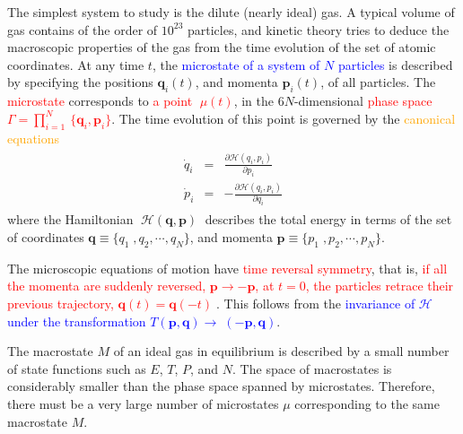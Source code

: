 \documentclass[12pt,a4paper]{article}
\renewcommand{\vec}[1]{\boldsymbol{#1}}
\newcounter{theo}[section]\setcounter{theo}{0}
\begin{document}
\cite{2007spp..book.....K} The simplest system to study is the dilute (nearly ideal) gas. A typical volume of gas contains of the order of $10^{23}$ particles, and kinetic theory tries to deduce the macroscopic properties of the gas from the time evolution of the set of atomic coordinates. At any time $t$, the \textcolor{blue}{microstate of a system of $N$ particles} is described by specifying the positions $\vec{q}_i(t)$, and momenta $\vec{p}_i(t)$, of all particles. The \textcolor{red}{microstate} corresponds to \textcolor{red}{a point 􏱕$\mu(t)$}, in the $6N$-dimensional \textcolor{red}{phase space $\Gamma = \prod_{i=1􏱌}^N \{\vec{q}_i, \vec{p}_i\}$}. The time evolution of this point is governed by the \textcolor{orange}{canonical equations}
\begin{eqnarray}
\begin{split}
\dot{q}_i &=& \frac{\partial \mathcal H(q_i, p_i)}{\partial p_i}  \\
\dot{p}_i &=& -\frac{\partial \mathcal H(q_i, p_i)}{\partial q_i} 
\end{split}
\end{eqnarray}
where the Hamiltonian 􏲾$\mathcal H(\vec{q}, \vec{p})$􏱑 describes the total energy in terms of the set of coordinates $\vec{q} \equiv \{ q_1􏱍, q_2, \cdots, q_N\}$, and momenta $\vec{p} \equiv \{ p_1􏱍, p_2, \cdots, p_N\}$.

The microscopic equations of motion have \textcolor{red}{time reversal symmetry}, that is, \textcolor{red}{if all the momenta are suddenly reversed, $\vec{p} \rightarrow -\vec{p}$, at $t = 0$, the particles retrace their previous trajectory, $\vec{q}(t) = \vec{q}(-t)$􏱑}. This follows from the \textcolor{blue}{invariance of $\mathcal H$ under the transformation $T(\vec{p}, \vec{q}) → 􏱐(-\vec{p}, \vec{q})$}.

The macrostate $M$ of an ideal gas in equilibrium is described by a small number of state functions such as $E$, $T$, $P$, and $N$. The space of macrostates is considerably smaller than the phase space spanned by microstates. Therefore, there must be a very large number of microstates $\mu$ corresponding to the same macrostate $M$.
\end{document}
